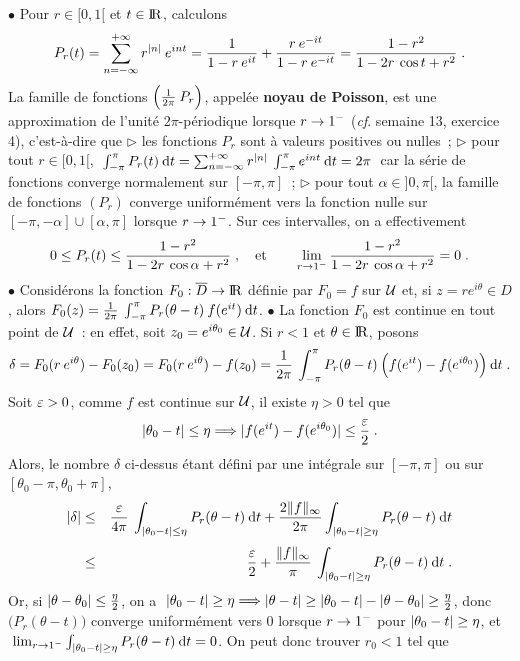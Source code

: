\documentclass{article}
\begin{document}
$\bullet$ Pour $r\in[0,1[$ et $t\in{\rm I\kern-0.6mm R}$, calculons\vv
$$P_r(t)=\sum_{n=-\infty}^{+\infty}r^{|n|}\>e^{int}={1\over1-r\>e^{it}}+{r\>e^{-it}\over1-r\>e^{-it}}={1-r^2\over1-2r\>\cos t+r^2}\;.$$\sect
La famille de fonctions $\Big({1\over2\pi}\>P_r\Big)$, appel\'ee {\bf noyau de Poisson}, est une approximation de l'unit\'e $2\pi$-p\'eriodique lorsque $r\rightarrow 1^-$ ({\it cf}. semaine 13, exercice 4), c'est-\`a-dire que\ssk\sect
$\triangleright$ les fonctions $P_r$ sont \`a valeurs positives ou nulles~;\ssk\sect
$\triangleright$ pour tout $r\in[0,1[$, $\;\int_{-\pi}^{\pi}P_r(t)\>{\rm d}t=\sum_{n=-\infty}^{+\infty}r^{|n|}\>\int_{-\pi}^{\pi}e^{int}\>{\rm d}t=2\pi\;$ car la s\'erie de fonctions converge normalement sur $[-\pi,\pi]$~;\ssk\sect
$\triangleright$ pour tout $\alpha\in]0,\pi[$, la famille de fonctions $(P_r)$ converge uniform\'ement vers la fonction nulle sur $[-\pi,-\alpha]\cup[\alpha,\pi]$ lorsque $r\rightarrow1^-$.
Sur ces intervalles, on a effectivement\vv
$$0\leq P_r(t)\leq{1-r^2\over1-2r\>\cos\alpha+r^2}\;,\quad{\rm et}\qquad\lim_{r\rightarrow1^-}{1-r^2\over1-2r\>\cos\alpha+r^2}=0\;.$$\ssk
$\bullet$ Consid\'erons la fonction $F_0:\overline{D}\rightarrow{\rm I\kern-0.6mm R}$ d\'efinie par $F_0=f$ sur ${\cal U}$ et, si $z=re^{i\theta}\in D$, alors $F_0(z)={1\over 2\pi}\>\int_{-\pi}^{\pi}P_r(\theta-t)\>f(e^{it})\>{\rm d}t$.\msk
$\bullet$ La fonction $F_0$ est continue en tout point de ${\cal U}$~: en effet, soit $z_0=e^{i\theta_0}\in{\cal U}$. Si $r<1$ et $\theta\in{\rm I\kern-0.6mm R}$, posons\vv
$$\delta=F_0(r\>e^{i\theta})-F_0(z_0)=F_0(r\>e^{i\theta})-f(z_0)={1\over2\pi}\>\int_{-\pi}^{\pi}P_r(\theta-t)\>\Big(f(e^{it})-f(e^{i\theta_0})\Big)\>{\rm d}t\;.$$
Soit $\varepsilon>0$, comme $f$ est continue sur ${\cal U}$, il existe $\eta>0$ tel que\vv
$$|\theta_0-t|\leq\eta\Longrightarrow|f(e^{it})-f(e^{i\theta_0})|\leq{\varepsilon\over2}\;.$$\sect
Alors, le nombre $\delta$ ci-dessus \'etant d\'efini par une int\'egrale sur $[-\pi,\pi]$ ou sur $[\theta_0-\pi,\theta_0+\pi]$,\vv
\begin{eqnarray*}
|\delta| & \ie & {\eps\s4\pi}\>\int_{|\theta_0-t|\ie\eta}P_r(\theta-t)\>{\rm d}t+{2\|f\|_{\infty}\s2\pi}\int_{|\theta_0-t|\se\eta}P_r(\theta-t)\>{\rm d}t\\ \nssk
& \ie & {\eps\s2}+{\|f\|_{\infty}\s\pi}\>\int_{|\theta_0-t|\se\eta}P_r(\theta-t)\>{\rm d}t\;.
\end{eqnarray*}\sect
Or, si $|\theta-\theta_0|\leq{\eta\over2}$, on a $\;|\theta_0-t|\geq\eta\Longrightarrow|\theta-t|\geq|\theta_0-t|-|\theta-\theta_0|\geq{\eta\over2}$, donc $\big(P_r(\theta-t)\big)$ converge uniform\'ement vers 0 lorsque $r\rightarrow1^-$ pour $|\theta_0-t|\geq\eta$, et $\;\lim_{r\rightarrow1^-}\int_{|\theta_0-t|\geq\eta}P_r(\theta-t)\>{\rm d}t=0$. On peut donc trouver $r_0<1$ tel que\vv
\end{document}
